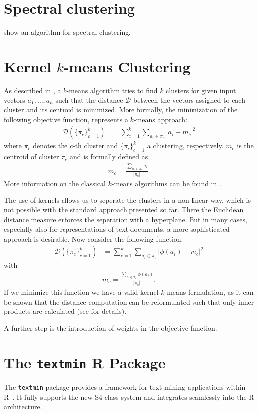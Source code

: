 \documentclass[a4paper]{article}
\begin{document}
\section{Spectral clustering}
\cite{ng02} show an algorithm for spectral clustering.
\section{Kernel $k$-means Clustering}
As described in \cite{dhillon05}, a $k$-means algorithm tries to find
$k$ clusters for given input vectors $a_1,\ldots,a_n$ such that the
distance $\mathcal{D}$ between the vectors assigned to each cluster
and its centroid is minimized. More formally, the minimization of the
following objective function, represents a $k$-means approach:
\begin{align*}
  \mathcal{D}(\{\pi_c\}^k_{c=1}) &= \sum^k_{c=1} \sum_{a_i \in \pi_c}
  |a_i - m_c|^2
\end{align*}
where $\pi_c$ denotes the $c$-th cluster and $\{\pi_c\}^k_{c=1}$ a
clustering, respectively. $m_c$ is the centroid of cluster $\pi_c$ and
is formally defined as
\begin{align*}
m_c = \frac{\sum_{a_i \in \pi_c} a_i}{|\pi_c|}
.\end{align*}
More information on the classical $k$-means algorithms can be found in
\cite{macqueen67}.

The use of kernels allows us to seperate the clusters in a non linear
way, which is not possible with the standard approach presented so
far. There the Euclidean distance measure enforces the seperation with
a hyperplane. But in many cases, especially also for representations
of text documents, a more sophisticated approach is desirable. Now
consider the following function:
\begin{align*}
  \mathcal{D}(\{\pi_c\}^k_{c=1}) &= \sum^k_{c=1} \sum_{a_i \in \pi_c}
  |\phi(a_i) - m_c|^2
\end{align*}
with
\begin{align*}
m_c = \frac{\sum_{a_i \in \pi_c} \phi(a_i)}{|\pi_c|}
.\end{align*}
If we minimize this function we have a valid kernel $k$-means
formulation, as it can be shown that the distance computation can be
reformulated such that only inner products are calculated (see
\cite[page 3]{dhillon05} for details).

A further step is the introduction of weights in the objective
function.
\section{The \texttt{textmin} \textsf{R} Package}
The \texttt{textmin} package provides a framework for text mining
applications within \textsf{R}~\citep{r05}. It fully supports the new
\textsf{S4} class system and integrates seamlessly into the \textsf{R}
architecture.
\end{document}
